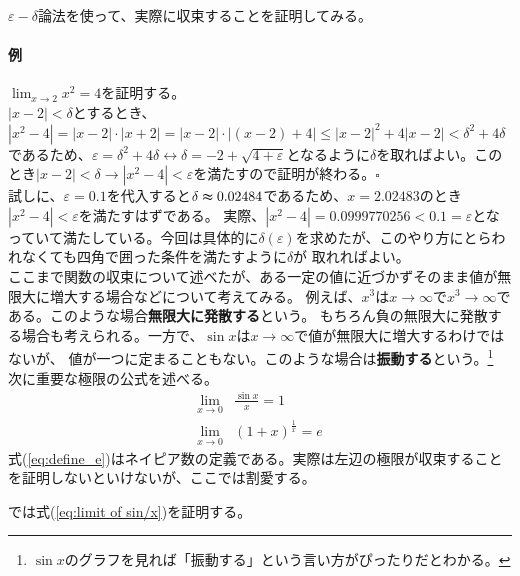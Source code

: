 \documentclass[a4j,dvipdfmx]{jsarticle}
\begin{document}
                $\varepsilon-\delta$論法を使って、実際に収束することを証明してみる。
                \paragraph*{例}$\displaystyle\lim_{x\to 2}x^2=4$を証明する。\\
                $|x-2|<\delta$とするとき、$|x^2-4|=|x-2|\cdot|x+2|=|x-2|\cdot|(x-2)+4|\leq |x-2|^2+4|x-2|<\delta^2+4\delta$
                であるため、$\varepsilon=\delta^2+4\delta\leftrightarrow \delta = -2+\sqrt{4+\varepsilon}$となるように$\delta$を取ればよい。このとき$|x-2|<\delta\rightarrow|x^2-4|<\varepsilon$を満たすので証明が終わる。$\square$\\

                試しに、$\varepsilon = 0.1$を代入すると$\delta \thickapprox 0.02484$であるため、$x=2.02483$のとき$|x^2-4|<\varepsilon$を満たすはずである。
                実際、$|x^2-4|=0.0999770256<0.1=\varepsilon$となっていて満たしている。今回は具体的に$\delta(\varepsilon)$を求めたが、このやり方にとらわれなくても四角で囲った条件を満たすように$\delta$が
                取れればよい。\\

                ここまで関数の収束について述べたが、ある一定の値に近づかずそのまま値が無限大に増大する場合などについて考えてみる。
                例えば、$x^3$は$x\to\infty$で$x^3\to\infty$である。このような場合\textbf{無限大に発散する}という。
                もちろん負の無限大に発散する場合も考えられる。一方で、$\sin x$は$x\to\infty$で値が無限大に増大するわけではないが、
                値が一つに定まることもない。このような場合は\textbf{振動する}という。\footnote{$\sin x$のグラフを見れば「振動する」という言い方がぴったりだとわかる。}\\

                次に重要な極限の公式を述べる。
                \begin{align}
                    \lim_{x\to 0}&\frac{\sin x}{x}=1\label{eq:limit of sin/x}\\
                    \lim_{x\to 0}&\left(1+x\right)^\frac{1}{x} = e\label{eq:define_e}
                \end{align}
                式(\ref{eq:define_e})はネイピア数の定義である。実際は左辺の極限が収束することを証明しないといけないが、ここでは割愛する。

                では式(\ref{eq:limit of sin/x})を証明する。
\end{document}
